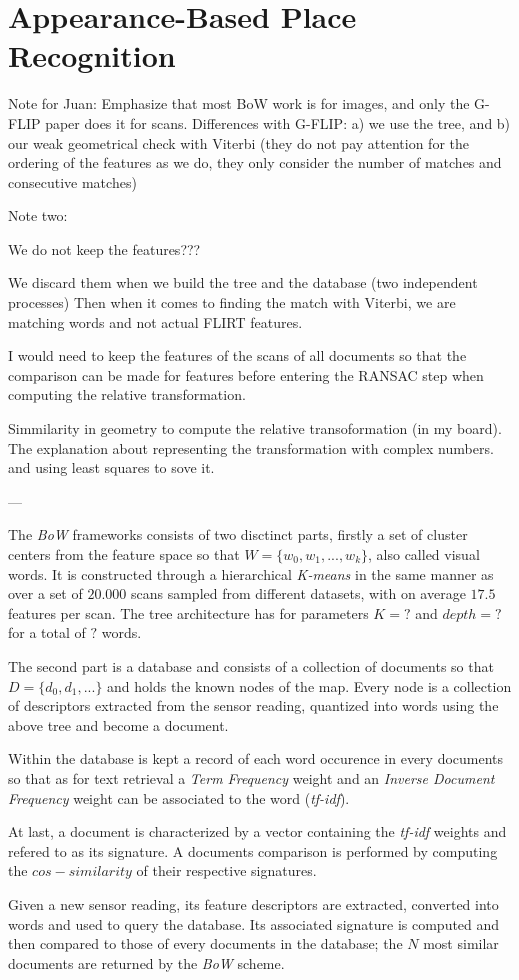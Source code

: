 \section{Appearance-Based Place Recognition}
\label{sec:chap2}


Note for Juan: Emphasize that most BoW work is for images, and only the G-FLIP paper does it for scans. Differences with G-FLIP: a) we use the tree, and b) our weak geometrical check with Viterbi (they do not pay attention for the ordering of the features as we do, they only consider the number of matches and consecutive matches)

Note two:

We do not keep the features???

We discard them when we build the tree and the database (two independent processes)
Then when it comes to finding the match with Viterbi, we are matching words and not actual FLIRT features. 

I would need to keep the features of the scans of all documents so that the comparison can
be made for features before entering the RANSAC step when computing the relative transformation.

Simmilarity in geometry to compute the relative transoformation (in my board). The explanation about representing the transformation with complex numbers. and using least squares to sove it.

---



The \textit{BoW} frameworks consists of two disctinct parts, firstly a set of cluster centers from the feature space so that $W=\{w_0, w_1,..., w_k\}$, also called visual words. It is constructed through a hierarchical \textit{K-means} in the same manner as \cite{Nister06} over a set of $20.000$ scans sampled from different datasets, with on average $17.5$ features per scan. The tree architecture has for parameters $K=?$ and $depth=?$ for a total of $?$ words.

The second part is a database and consists of a collection of documents so that $D=\{d_0, d_1,...\}$ and holds the known nodes of the map. Every node is a collection of descriptors extracted from the sensor reading, quantized into words using the above tree and become a document.

Within the database is kept a record of each word occurence in every documents so that as for text retrieval a \textit{Term Frequency} weight and an \textit{Inverse Document Frequency} weight can be associated to the word (\textit{tf-idf}).

At last, a document is characterized by a vector containing the \textit{tf-idf} weights and refered to as its signature. A documents comparison is performed by computing the $cos-similarity$ of their respective signatures.

Given a new sensor reading, its feature descriptors are extracted, converted into words and used to query the database. Its associated signature is computed and then compared to those of every documents in the database; the $N$ most similar documents are returned by the \textit{BoW} scheme.